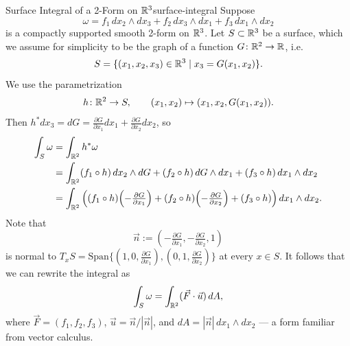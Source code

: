 \begin{example}{Surface Integral of a 2-Form on $\mathbb{R}^3$}{surface-integral}
    Suppose
    \[
        \omega = f_1\, dx_2 \wedge dx_3 + f_2\, dx_3 \wedge dx_1 + f_3\, dx_1 \wedge dx_2
    \]
    is a compactly supported smooth 2-form on $\mathbb{R}^3$. Let $S \subset \mathbb{R}^3$ be a surface, which we assume for simplicity to be the graph of a function $G \colon \mathbb{R}^2 \to \mathbb{R}$, i.e.\
    \[
        S = \{(x_1, x_2, x_3) \in \mathbb{R}^3 \mid x_3 = G(x_1, x_2)\}.
    \]
    We use the parametrization
    \[
        h \colon \mathbb{R}^2 \to S, \qquad (x_1, x_2) \mapsto (x_1, x_2, G(x_1, x_2)).
    \]
    Then $h^* dx_3 = dG = \tfrac{\partial G}{\partial x_1} dx_1 + \tfrac{\partial G}{\partial x_2} dx_2$, so
    \begin{align*}
        \int_S \omega &= \int_{\mathbb{R}^2} h^*\omega \\
        &= \int_{\mathbb{R}^2} (f_1 \circ h)\, dx_2 \wedge dG + (f_2 \circ h)\, dG \wedge dx_1 + (f_3 \circ h)\, dx_1 \wedge dx_2 \\
        &= \int_{\mathbb{R}^2} \left((f_1 \circ h)\!\left(-\tfrac{\partial G}{\partial x_1}\right) + (f_2 \circ h)\!\left(-\tfrac{\partial G}{\partial x_2}\right) + (f_3 \circ h)\right) dx_1 \wedge dx_2.
    \end{align*}
    Note that
    \[
        \vec{n} := \left(-\tfrac{\partial G}{\partial x_1}, -\tfrac{\partial G}{\partial x_2}, 1\right)
    \]
    is normal to $T_x S = \mathrm{Span}\{(1, 0, \tfrac{\partial G}{\partial x_1}), (0, 1, \tfrac{\partial G}{\partial x_2})\}$ at every $x \in S$. It follows that we can rewrite the integral as
    \[
        \int_S \omega = \int_{\mathbb{R}^2} (\vec{F} \cdot \vec{u})\, dA,
    \]
    where $\vec{F} = (f_1, f_2, f_3)$, $\vec{u} = \vec{n}/|\vec{n}|$, and $dA = |\vec{n}|\, dx_1 \wedge dx_2$ — a form familiar from vector calculus.
\end{example}
